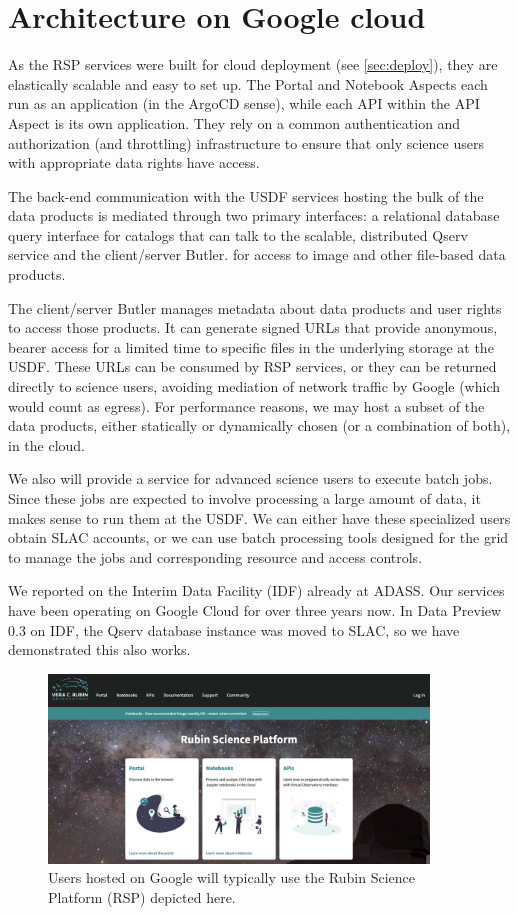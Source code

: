 \section{Architecture on Google cloud} \label{sec:google}

As the RSP services were built for cloud deployment (see \autoref{sec:deploy}), they are elastically scalable and easy to set up.
The Portal and Notebook Aspects each run as an application (in the ArgoCD sense), while each API within the API Aspect is its own application.
They rely on a common authentication and authorization (and throttling) infrastructure to ensure that only science users with appropriate data rights have access.

The back-end communication with the USDF services hosting the bulk of the data products is mediated through two primary interfaces: a relational database query interface for catalogs that can talk to the scalable, distributed Qserv service\cite{2011Wang:2011:QDS:2063348.2063364} and the client/server Butler\cite{2024SPIE13101.129Jtmp,2022SPIE12189E..11J}. for access to image and other file-based data products.

The client/server Butler manages metadata about data products and user rights to access those products.
It can generate signed URLs that provide anonymous, bearer access for a limited time to specific files in the underlying storage at the USDF.
These URLs can be consumed by RSP services, or they can be returned directly to science users, avoiding mediation of network traffic by Google (which would count as egress).
For performance reasons, we may host a subset of the data products, either statically or dynamically chosen (or a combination of both), in the cloud.

We also will provide a service for advanced science users to execute batch jobs.
Since these jobs are expected to involve processing a large amount of data, it makes sense to run them at the USDF.
We can either have these specialized users obtain SLAC accounts, or we can use batch processing tools designed for the grid to manage the jobs and corresponding resource and access controls.

We reported on the Interim Data Facility (IDF) already at ADASS\cite{2021arXiv211115030O}.
Our services have been operating on Google Cloud for over three years now.
In Data Preview 0.3 on IDF,\cite{RTN-050} the Qserv database instance was moved to SLAC, so we have demonstrated this also works.


\begin{figure}
\begin{centering}
\includegraphics[width=0.9\textwidth]{RSP.png}
	\caption{ Users hosted on Google will typically use the Rubin Science Platform (RSP) depicted here.  \label{fig:rsp}}
\end{centering}
\end{figure}
